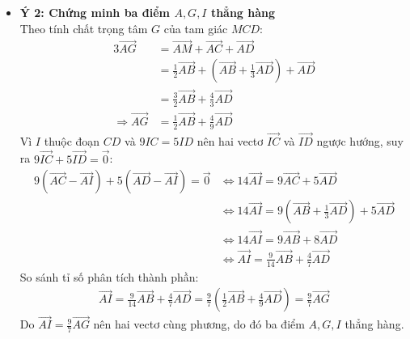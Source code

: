 \documentclass[12pt,a4paper]{article}
\begin{document}
\begin{itemize}
\begin{itemize}
\begin{itemize}
            \item \textbf{Ý 2: Chứng minh ba điểm $A, G, I$ thẳng hàng}\\
            Theo tính chất trọng tâm $G$ của tam giác $MCD$:
            \begin{align*}
                3\vec{AG} &= \vec{AM} + \vec{AC} + \vec{AD} \\
                &= \frac{1}{2}\vec{AB} + \left(\vec{AB} + \frac{1}{3}\vec{AD}\right) + \vec{AD} \\
                &= \frac{3}{2}\vec{AB} + \frac{4}{3}\vec{AD} \\
                \Longrightarrow \vec{AG} &= \frac{1}{2}\vec{AB} + \frac{4}{9}\vec{AD}
            \end{align*}
            Vì $I$ thuộc đoạn $CD$ và $9IC = 5ID$ nên hai vectơ $\vec{IC}$ và $\vec{ID}$ ngược hướng, suy ra $9\vec{IC} + 5\vec{ID} = \vec{0}$:
            \begin{align*}
                9(\vec{AC} - \vec{AI}) + 5(\vec{AD} - \vec{AI}) = \vec{0} &\Longleftrightarrow 14\vec{AI} = 9\vec{AC} + 5\vec{AD} \\
                &\Longleftrightarrow 14\vec{AI} = 9\left(\vec{AB} + \frac{1}{3}\vec{AD}\right) + 5\vec{AD} \\
                &\Longleftrightarrow 14\vec{AI} = 9\vec{AB} + 8\vec{AD} \\
                &\Longleftrightarrow \vec{AI} = \frac{9}{14}\vec{AB} + \frac{4}{7}\vec{AD}
            \end{align*}
            So sánh tỉ số phân tích thành phần:
            \begin{align*}
                \vec{AI} = \frac{9}{14}\vec{AB} + \frac{4}{7}\vec{AD} = \frac{9}{7}\left(\frac{1}{2}\vec{AB} + \frac{4}{9}\vec{AD}\right) = \frac{9}{7}\vec{AG}
            \end{align*}
            Do $\vec{AI} = \frac{9}{7}\vec{AG}$ nên hai vectơ cùng phương, do đó ba điểm $A, G, I$ thẳng hàng.


\end{itemize}
\end{itemize}
\end{itemize}
\end{document}
